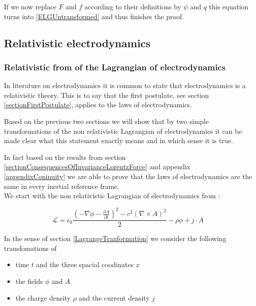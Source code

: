 \documentclass{article}
\begin{document}
If we now replace $F$ and $f$ according to their definitions by $\psi$ and $q$ this equation turns into \ref{ELGUntransformed} and thus finishes the proof.


\subsection{Relativistic electrodynamics}

\subsubsection{Relativistic from of the Lagrangian of electrodynamics} \label{sectionRelativisticLagrangianElectrodynamics}
In literature on electrodynamics it is common to state that electrodynamics is a relativistic theory.
This is to say that the first postulate, see section \ref{sectionFirstPostulate}, applies to the laws of electrodynamics.

Based on the previous two sections we will show that by two simple transformations of the
non relativistic Lagrangian of electrodynamics it can be made clear what this statement exactly means and in which sense it is true.

In fact based on the results from section \ref{sectionConsequencesOfInvarianceLorentzForce} and appendix \ref{appendixConinuity} we are able to prove that the laws of electrodynamics are the same in every inertial reference frame.
\\

We start with the non relativistic Lagrangian of electrodynamics from \cite{LagrangeOfField}:

\begin{equation} \label{LagrangianElectDynClassical}
    \mathcal{L} = \epsilon_0 \frac{(-\nabla\phi - \frac{\partial A}{\partial t})^2 - c^2 (\nabla \times A)^2}{2} - \rho\phi + j \cdot A
\end{equation}


In the sense of section \ref{LagrangeTranformation} we consider the following transfomations of
\begin{itemize}
    \item time $t$ and the three spacial coodinates $x$
    \item the fields $\phi$ and $A$
    \item the charge density $\rho$ and the current density $j$
\end{itemize}
\end{document}
